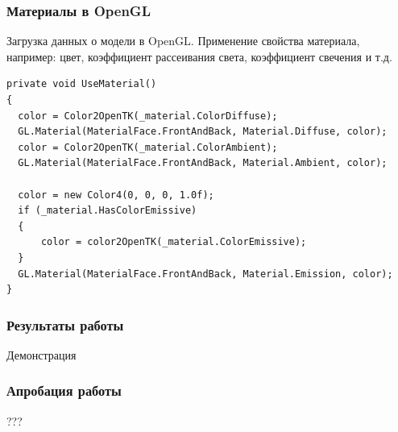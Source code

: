 \documentclass{beamer}
\begin{document}
\begin{frame}[fragile]
\frametitle{Материалы в OpenGL}
	Загрузка данных о модели в OpenGL.
    Применение свойства материала, например: цвет, коэффициент рассеивания света, коэффициент свечения и т.д.
    
\begin{scriptsize}
\begin{lstlisting}
private void UseMaterial()
{
  color = Color2OpenTK(_material.ColorDiffuse);  
  GL.Material(MaterialFace.FrontAndBack, Material.Diffuse, color);  
  color = Color2OpenTK(_material.ColorAmbient);
  GL.Material(MaterialFace.FrontAndBack, Material.Ambient, color);

  color = new Color4(0, 0, 0, 1.0f);
  if (_material.HasColorEmissive)
  {
      color = color2OpenTK(_material.ColorEmissive);              
  }
  GL.Material(MaterialFace.FrontAndBack, Material.Emission, color);
}
\end{lstlisting}
\end{scriptsize}
  
\end{frame}





\begin{frame}
\frametitle{Результаты работы}
    \begin{center}            
    \begin{large}
    Демонстрация
    \end{large}
    \end{center}
\end{frame}



\begin{frame}
\frametitle{Апробация работы}
    \begin{center}            
    \begin{large}
    ???
    \end{large}
    \end{center}
\end{frame}
\end{document}
